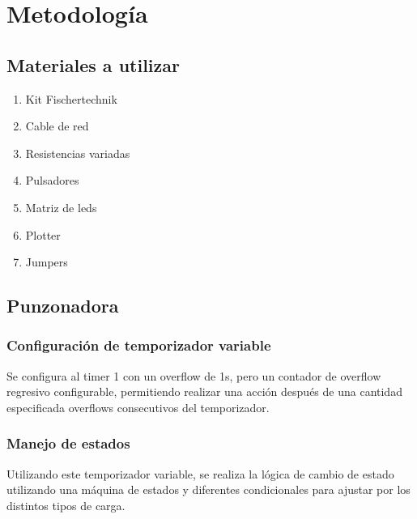 \newpage

\section{Metodología}

\subsection{Materiales a utilizar}
\begin{enumerate}
    \item Kit Fischertechnik
    \item Cable de red
    \item Resistencias variadas
    \item Pulsadores
    \item Matriz de leds
    \item Plotter 
    \item Jumpers
\end{enumerate}


\subsection{Punzonadora}
\subsubsection{Configuración de temporizador variable}
Se configura al timer 1 con un overflow de 1s, pero un contador de overflow regresivo configurable, permitiendo realizar una acción después de una cantidad especificada overflows consecutivos del temporizador. 

\subsubsection{Manejo de estados}
Utilizando este temporizador variable, se realiza la lógica de cambio de estado utilizando una máquina de estados y diferentes condicionales para ajustar por los distintos tipos de carga. 

